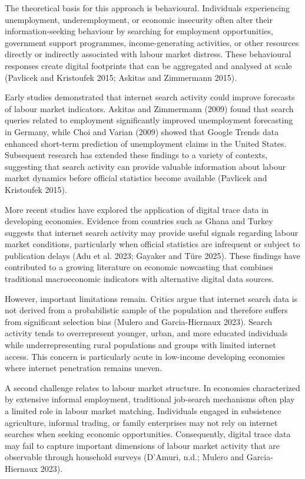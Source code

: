 \documentclass[
  letterpaper,
  DIV=11,
  numbers=noendperiod]{scrartcl}
\begin{document}
The theoretical basis for this approach is behavioural. Individuals
experiencing unemployment, underemployment, or economic insecurity often
alter their information-seeking behaviour by searching for employment
opportunities, government support programmes, income-generating
activities, or other resources directly or indirectly associated with
labour market distress. These behavioural responses create digital
footprints that can be aggregated and analysed at scale (Pavlicek and
Kristoufek 2015; Askitas and Zimmermann 2015).

Early studies demonstrated that internet search activity could improve
forecasts of labour market indicators. Askitas and Zimmermann (2009)
found that search queries related to employment significantly improved
unemployment forecasting in Germany, while Choi and Varian (2009) showed
that Google Trends data enhanced short-term prediction of unemployment
claims in the United States. Subsequent research has extended these
findings to a variety of contexts, suggesting that search activity can
provide valuable information about labour market dynamics before
official statistics become available (Pavlicek and Kristoufek 2015).

More recent studies have explored the application of digital trace data
in developing economies. Evidence from countries such as Ghana and
Turkey suggests that internet search activity may provide useful signals
regarding labour market conditions, particularly when official
statistics are infrequent or subject to publication delays (Adu et al.
2023; Gayaker and Türe 2025). These findings have contributed to a
growing literature on economic nowcasting that combines traditional
macroeconomic indicators with alternative digital data sources.

However, important limitations remain. Critics argue that internet
search data is not derived from a probabilistic sample of the population
and therefore suffers from significant selection bias (Mulero and
Garcia-Hiernaux 2023). Search activity tends to overrepresent younger,
urban, and more educated individuals while underrepresenting rural
populations and groups with limited internet access. This concern is
particularly acute in low-income developing economies where internet
penetration remains uneven.

A second challenge relates to labour market structure. In economies
characterized by extensive informal employment, traditional job-search
mechanisms often play a limited role in labour market matching.
Individuals engaged in subsistence agriculture, informal trading, or
family enterprises may not rely on internet searches when seeking
economic opportunities. Consequently, digital trace data may fail to
capture important dimensions of labour market activity that are
observable through household surveys (D'Amuri, n.d.; Mulero and
Garcia-Hiernaux 2023).
\end{document}
